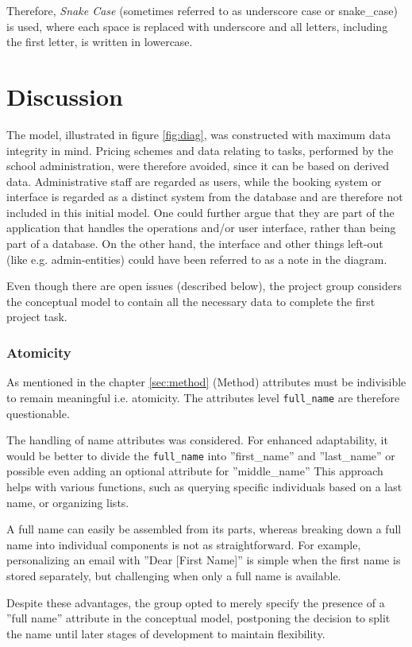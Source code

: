 \documentclass[a4paper]{scrartcl}
\begin{document}
Therefore, \emph{Snake Case}
(sometimes referred to as underscore case or 
 snake\_case)
is used, where each space is replaced with underscore
and all letters, including the first letter, is written in lowercase. 

\section{Discussion}
The model, illustrated in figure \ref{fig:diag}, was constructed with maximum
data integrity in mind.
Pricing schemes and data relating to tasks, performed by the school
administration, were therefore avoided, since it can be based on derived data.
Administrative staff are regarded as users, while the booking system or
interface is regarded as a distinct system from the database and are therefore
not included in this initial model. One could further argue that they are part
of the application that handles the operations and/or user interface, rather
than being part of a database.  
On the other hand, the interface and other things left-out (like e.g.
admin-entities) could have been referred to as a note in the diagram.  

Even though there are open issues (described below), the project group considers
the conceptual model to contain all the necessary data to complete the first
project task.  

\subsubsection*{Atomicity}
As mentioned in the chapter \ref{sec:method} (Method) 
attributes must be indivisible to
remain meaningful i.e. atomicity.
The attributes
level
\verb|full_name|
are therefore questionable.

The handling of name attributes was considered. 
For enhanced adaptability,  it
would be better to divide the 
\verb|full_name| into ''first\_name'' and ''last\_name'' or
possible even adding an optional attribute for ''middle\_name'' 
This approach helps with various functions, such as querying specific
individuals based on a last name, or organizing lists.

A full name can easily be assembled from its parts, 
whereas breaking down a full
name into individual components is not as straightforward. 
For example,
personalizing an email with ''Dear [First Name]'' 
is simple when the first name is
stored separately, but challenging when only a full name is available.

Despite these advantages, the group opted to merely specify the presence of a
''full name'' attribute in the conceptual model, postponing the decision to split
the name until later stages of development to maintain flexibility.
\end{document}
